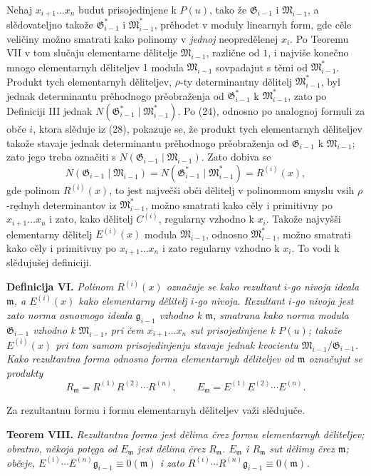 \documentclass[11pt]{article}
\providecommand{\Gmod}{\mathfrak G}
\providecommand{\Mmod}{\mathfrak M}
\providecommand{\mideal}{\mathfrak m}
\providecommand{\gideal}{\mathfrak g}
\begin{document}
Nehaj $x_{i+1}\ldots x_n$ budut prisojedinjene k $P(u)$, tako že $\Gmod_{i-1}$ i $\Mmod_{i-1}$, a slědovateljno takože $\Gmod^*_{i-1}$ i $\Mmod^*_{i-1}$, prěhodet v moduly linearnyh form, gde cěle veličiny možno smatrati kako polinomy v {\itshape jednoj} neopredělenej $x_i$. Po Teoremu VII v tom slučaju elementarne dělitelje $\Mmod_{i-1}$, različne od $1$, i najviše konečno mnogo elementarnyh děliteljev $1$ modula $\Mmod_{i-1}$ sovpadajut s těmi od $\Mmod^*_{i-1}$. Produkt tych elementarnyh děliteljev, $\rho$-ty determinantny dělitelj $\Mmod^*_{i-1}$, byl jednak determinantu prěhodnogo prěobraženja od $\Gmod^*_{i-1}$ k $\Mmod^*_{i-1}$, zato po Definiciji III jednak $N(\Gmod^*_{i-1}\mid\Mmod^*_{i-1})$. Po (24), odnosno po analognoj formuli za obče $i$, ktora slěduje iz (28), pokazuje se, že produkt tych elementarnyh děliteljev takože stavaje jednak determinantu prěhodnogo prěobraženja od $\Gmod_{i-1}$ k $\Mmod_{i-1}$; zato jego treba označiti s $N(\Gmod_{i-1}\mid\Mmod_{i-1})$. Zato dobiva se
\[
 N(\Gmod_{i-1}\mid\Mmod_{i-1})=N(\Gmod^*_{i-1}\mid\Mmod^*_{i-1})=R^{(i)}(x),
\]
gde polinom $R^{(i)}(x)$, to jest največši obči dělitelj v polinomnom smyslu vsih $\rho$-rędnyh determinantov iz $\Mmod^*_{i-1}$, možno smatrati kako cěly i primitivny po $x_{i+1}\ldots x_n$ i zato, kako dělitelj $C^{(i)}$, regularny vzhodno k $x_i$. Takože najvyšši elementarny dělitelj $E^{(i)}(x)$ modula $\Mmod_{i-1}$, odnosno $\Mmod^*_{i-1}$, možno smatrati kako cěly i primitivny po $x_{i+1}\ldots x_n$ i zato regularny vzhodno k $x_i$. To vodi k slědujušej definiciji.

\medskip
\noindent\textbf{Definicija VI.} {\itshape Polinom $R^{(i)}(x)$ označuje se kako rezultant $i$-go nivoja ideala $\mideal$, a $E^{(i)}(x)$ kako elementarny dělitelj $i$-go nivoja. Rezultant $i$-go nivoja jest zato norma osnovnogo ideala $\gideal_{i-1}$ vzhodno k $\mideal$, smatrana kako norma modula $\Gmod_{i-1}$ vzhodno k $\Mmod_{i-1}$, pri čem $x_{i+1}\ldots x_n$ sut prisojedinjene k $P(u)$; takože $E^{(i)}(x)$ pri tom samom prisojedinjenju stavaje jednak kvocientu $\Mmod_{i-1}/\Gmod_{i-1}$. Kako rezultantna forma odnosno forma elementarnyh děliteljev od $\mideal$ označujut se produkty}
\[
 R_\mideal=R^{(1)}R^{(2)}\cdots R^{(n)},\qquad
 E_\mideal=E^{(1)}E^{(2)}\cdots E^{(n)}.
\]

Za rezultantnu formu i formu elementarnyh děliteljev važi slědujuče.

\medskip
\noindent\textbf{Teorem VIII.} {\itshape Rezultantna forma jest dělima črez formu elementarnyh děliteljev; obratno, někoja potęga od $E_\mideal$ jest dělima črez $R_\mideal$. $E_\mideal$ i $R_\mideal$ sut dělimy črez $\mideal$; občeje, $E^{(i)}\cdots E^{(n)}\gideal_{i-1}\equiv0(\mideal)$ i zato $R^{(i)}\cdots R^{(n)}\gideal_{i-1}\equiv0(\mideal)$.}
\end{document}
